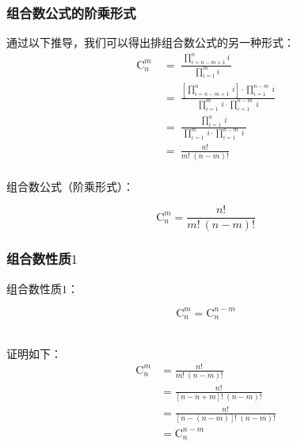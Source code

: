 \documentclass[UTF8]{ctexart}
\begin{document}
\newpage

\subsubsection{组合数公式的阶乘形式}
    通过以下推导，我们可以得出排组合数公式的另一种形式：\vspace{5pt}
    \setcounter{equation}{0}
    \begin{align}
        \mathrm{C}_n^m~
        &=~\frac{~\prod_{i=n-m+1}^{n}i~}{\,\prod_{i=1}^{m}i}\\[4mm]
        &=~\frac{\left[\prod_{i=n-m+1}^n~i\right]\cdot\prod_{i=1}^{n-m}~i}{\prod_{i=1}^{m}~i\cdot\prod_{i=1}^{n-m}~i}\\[4mm]
        &=~\frac{\prod_{i=1}^{n}~i}{~\prod_{i=1}^{m}~i\cdot\prod_{i=1}^{n-m}~i~}\\[4mm]
        &=~\frac{n!}{m!~(n-m)!}
    \end{align}\\
    组合数公式（阶乘形式）：
    \begin{large}
        \begin{equation*}
            \mathrm{C}_n^m=\frac{n!}{m!~(n-m)!}
        \end{equation*}
    \end{large}

\subsubsection{组合数性质$1$}
    组合数性质$1$：
    \begin{large}
        \begin{equation*}
            \mathrm{C}_{n}^{m}=\mathrm{C}_{n}^{n-m}
        \end{equation*}
    \end{large}\\
    证明如下：
    \setcounter{equation}{0}
    \begin{align}
        \mathrm{C}_n^m
        &=\frac{n!}{m!~(n-m)!}\\[3mm]
        &=\frac{n!}{\left[n-n+m\right]!~(n-m)!}\\[3mm]
        &=\frac{n!}{\left[n-(n-m)\right]!~(n-m)!}\\[3mm]
        &=\mathrm{C}_{n}^{n-m}
    \end{align}

\newpage
\end{document}
